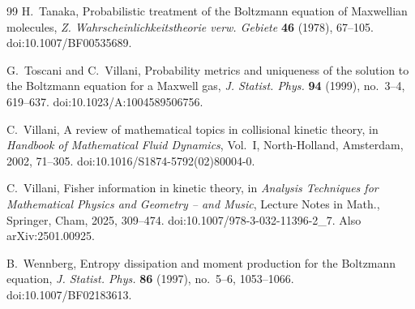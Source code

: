 \documentclass[11pt]{amsart}
\theoremstyle{definition}
\begin{document}
\begin{thebibliography}{99}
 H.~Tanaka, Probabilistic treatment of the Boltzmann equation of Maxwellian molecules, \emph{Z. Wahrscheinlichkeitstheorie verw. Gebiete} \textbf{46} (1978), 67--105. doi:10.1007/BF00535689.

 G.~Toscani and C.~Villani, Probability metrics and uniqueness of the solution to the Boltzmann equation for a Maxwell gas, \emph{J. Statist. Phys.} \textbf{94} (1999), no.~3--4, 619--637. doi:10.1023/A:1004589506756.

 C.~Villani, A review of mathematical topics in collisional kinetic theory, in \emph{Handbook of Mathematical Fluid Dynamics}, Vol.~I, North-Holland, Amsterdam, 2002, 71--305. doi:10.1016/S1874-5792(02)80004-0.

 C.~Villani, Fisher information in kinetic theory, in \emph{Analysis Techniques for Mathematical Physics and Geometry -- and Music}, Lecture Notes in Math., Springer, Cham, 2025, 309--474. doi:10.1007/978-3-032-11396-2\_7. Also arXiv:2501.00925.

 B.~Wennberg, Entropy dissipation and moment production for the Boltzmann equation, \emph{J. Statist. Phys.} \textbf{86} (1997), no.~5--6, 1053--1066. doi:10.1007/BF02183613.

\end{thebibliography}
\end{document}
